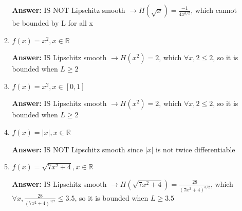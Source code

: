 \documentclass{assignment}
\newcommand{\R}{\mathbb{R}}
\begin{document}
\begin{problem}
\begin{enumerate}
\begin{enumerate}[label=(\alph*)]
        \color{blue}\textbf{Answer:} IS NOT Lipschitz smooth $\rightarrow H(\sqrt{x}) = \frac{-1}{4x^{3/2}}$, which cannot be bounded by L for all x \color{black}


        
        \item $f(x) = x^2, x \in \R$

        \color{blue}\textbf{Answer:} IS Lipschitz smooth $\rightarrow H(x^2) = 2$, which $\forall x, 2 \leq 2$, so it is bounded when $L \geq 2$ \color{black}


        
        \item $f(x) = x^2, x \in [0,1]$

        \color{blue}\textbf{Answer:} IS Lipschitz smooth $\rightarrow H(x^2) = 2$, which $\forall x, 2 \leq 2$, so it is bounded when $L \geq 2$ \color{black}



        \item $f(x) = |x|, x \in \R$

        \color{blue}\textbf{Answer:} IS NOT Lipschitz smooth since $|x|$ is not twice differentiable \color{black}


        
        \item $f(x) = \sqrt{7x^2 + 4}, x \in \R$

        \color{blue}\textbf{Answer:} IS Lipschitz smooth $\rightarrow H(\sqrt{7x^2 + 4}) = \frac{28}{(7x^2 + 4)^{3/2}}$, which $\forall x, \frac{28}{(7x^2 + 4)^{3/2}} \leq 3.5$, so it is bounded when $L \geq 3.5$ \color{black}


\end{enumerate}
\end{enumerate}
\end{problem}
\end{document}
